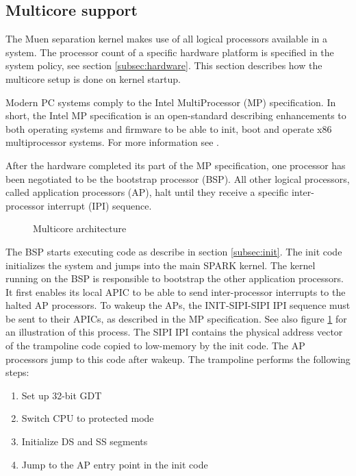 \subsection{Multicore support}\label{subsec:mp-support}
The Muen separation kernel makes use of all logical processors available in a
system. The processor count of a specific hardware platform is specified in the
system policy, see section \ref{subsec:hardware}. This section describes how the
multicore setup is done on kernel startup.

Modern PC systems comply to the Intel MultiProcessor (MP)
specification. In short, the Intel MP specification is an open-standard
describing enhancements to both operating systems and firmware to be able to
init, boot and operate x86 multiprocessor systems. For more information see
\cite{intel:mp}.

After the hardware completed its part of the MP specification, one processor
has been negotiated to be the bootstrap processor (BSP). All other
logical processors, called application processors (AP), halt until
they receive a specific inter-processor interrupt (IPI) sequence.

\begin{figure}[h]
	\centering
	
	\caption{Multicore architecture}
	\label{fig:mp-overview}
\end{figure}

The BSP starts executing code as describe in section \ref{subsec:init}. The
init code initializes the system and jumps into the main SPARK kernel. The
kernel running on the BSP is responsible to bootstrap the other application
processors. It first enables its local APIC to be able to send
inter-processor interrupts to the halted AP processors. To wakeup the APs, the
INIT-SIPI-SIPI IPI sequence must be sent to their APICs, as described in the MP
specification. See also figure \ref{fig:mp-overview} for an illustration of
this process. The SIPI IPI contains the physical address vector of the
trampoline code copied to low-memory by the init code. The AP processors jump
to this code after wakeup. The trampoline performs the following steps:

\begin{enumerate}
	\item Set up 32-bit GDT
	\item Switch CPU to protected mode
	\item Initialize DS and SS segments
	\item Jump to the AP entry point in the init code
\end{enumerate}


